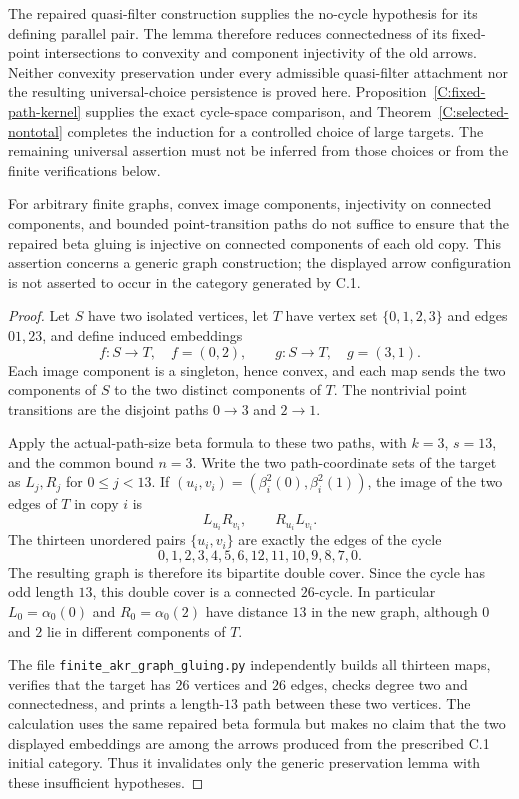 \begin{remark}
\label{C:convex-obligation}
The repaired quasi-filter construction supplies the no-cycle
hypothesis for its defining parallel pair. The lemma therefore
reduces connectedness of its fixed-point intersections to convexity
and component injectivity of the old arrows. Neither convexity
preservation under every admissible quasi-filter attachment nor
the resulting universal-choice persistence is proved here.
Proposition~\ref{C:fixed-path-kernel} supplies the exact cycle-space
comparison, and Theorem~\ref{C:selected-nontotal} completes the
induction for a controlled choice of large targets. The remaining
universal assertion must not be inferred from those choices or from
the finite verifications below.
\end{remark}

\begin{proposition}
\label{C:generic-component-warning}
For arbitrary finite graphs, convex image components, injectivity on
connected components, and bounded point-transition paths do not suffice
to ensure that the repaired beta gluing is injective on connected
components of each old copy. This assertion concerns a generic graph
construction; the displayed arrow configuration is not asserted to
occur in the category generated by C.1.
\end{proposition}
\begin{proof}
Let $S$ have two isolated vertices, let $T$ have vertex set
$\{0,1,2,3\}$ and edges $01,23$, and define induced embeddings
\[
 f:S\to T,\quad f=(0,2),\qquad
 g:S\to T,\quad g=(3,1).
\]
Each image component is a singleton, hence convex, and each map
sends the two components of $S$ to the two distinct components of
$T$. The nontrivial point transitions are the disjoint paths
$0\to3$ and $2\to1$.

Apply the actual-path-size beta formula to these two paths, with
$k=3$, $s=13$, and the common bound $n=3$. Write the two path-coordinate
sets of the target as $L_j,R_j$ for $0\leq j<13$. If
$(u_i,v_i)=(\beta_i^2(0),\beta_i^2(1))$, the image of the two
edges of $T$ in copy $i$ is
\[
 L_{u_i}R_{v_i},\qquad R_{u_i}L_{v_i}.
\]
The thirteen unordered pairs $\{u_i,v_i\}$ are exactly the edges
of the cycle
\[
 0,1,2,3,4,5,6,12,11,10,9,8,7,0.
\]
The resulting graph is therefore its bipartite double cover. Since
the cycle has odd length $13$, this double cover is a connected
$26$-cycle. In particular $L_0=\alpha_0(0)$ and
$R_0=\alpha_0(2)$ have distance $13$ in the new graph, although
$0$ and $2$ lie in different components of $T$.

The file \texttt{finite\_akr\_graph\_gluing.py} independently builds
all thirteen maps, verifies that the target has $26$ vertices and
$26$ edges, checks degree two and connectedness, and prints a
length-$13$ path between these two vertices. The calculation uses
the same repaired beta formula but makes no claim that the two
displayed embeddings are among the arrows produced from the
prescribed C.1 initial category. Thus it invalidates only the generic
preservation lemma with these insufficient hypotheses.
\end{proof}

